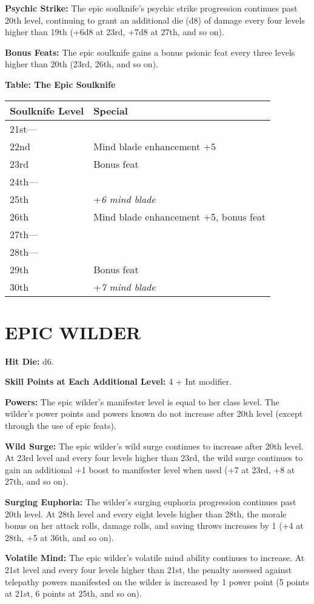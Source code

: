 \documentclass{article}
\begin{document}
\textbf{Psychic Strike: }The epic soulknife's psychic strike progression continues 
past 20th level, continuing to grant an additional die (d8) of damage every four 
levels higher than 19th (+6d8 at 23rd, +7d8 at 27th, and so on).

\textbf{Bonus Feats: }The epic soulknife gains a bonus psionic feat every three 
levels higher than 20th (23rd, 26th, and so on).

\textbf{Table: The Epic Soulknife }

\begin{tabular}{|>{\raggedright}p{70pt}|>{\raggedright}p{164pt}|}
\hline
S\textbf{oulknife Level} & S\textbf{pecial }\tabularnewline
\hline
21st--- &  \tabularnewline
\hline
22nd & Mind blade enhancement +5\tabularnewline
\hline
23rd & Bonus feat\tabularnewline
\hline
24th--- &  \tabularnewline
\hline
25th & +\textit{6 mind blade }\tabularnewline
\hline
26th & Mind blade enhancement +5, bonus feat\tabularnewline
\hline
27th--- &  \tabularnewline
\hline
28th--- &  \tabularnewline
\hline
29th & Bonus feat\tabularnewline
\hline
30th & +\textit{7 mind blade }\tabularnewline
\hline
\end{tabular}

\vspace{12pt}
\section*{{\LARGE{}EPIC WILDER}}

\textbf{Hit Die:} d6.

\textbf{Skill Points at Each Additional Level:} 4 + Int modifier.

\textbf{Powers:} The epic wilder's manifester level is equal to her class level. 
The wilder's power points and powers known do not increase after 20th level (except 
through the use of epic feats).

\textbf{Wild Surge: }The epic wilder's wild surge continues to increase after 20th 
level. At 23rd level and every four levels higher than 23rd, the wild surge continues 
to gain an additional +1 boost to manifester level when used (+7 at 23rd, +8 at 
27th, and so on).

\textbf{Surging Euphoria:} The wilder's surging euphoria progression continues 
past 20th level. At 28th level and every eight levels higher than 28th, the morale 
bonus on her attack rolls, damage rolls, and saving throws increases by 1 (+4 at 
28th, +5 at 36th, and so on).

\textbf{Volatile Mind: }The epic wilder's volatile mind ability continues to increase. 
At 21st level and every four levels higher than 21st, the penalty assessed against 
telepathy powers manifested on the wilder is increased by 1 power point (5 points 
at 21st, 6 points at 25th, and so on).
\end{document}
